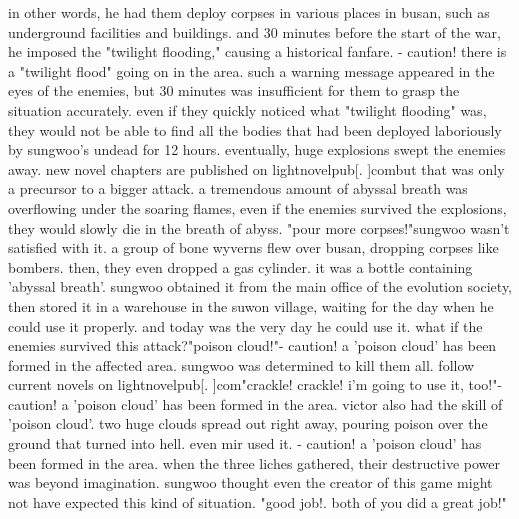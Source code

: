  in other words, he had them deploy corpses in various places in busan, such as underground facilities and buildings.
and 30 minutes before the start of the war, he imposed the "twilight flooding," causing a historical fanfare.
- caution! there is a "twilight flood" going on in the area.
such a warning message appeared in the eyes of the enemies, but 30 minutes was insufficient for them to grasp the situation accurately.
 even if they quickly noticed what "twilight flooding" was, they would not be able to find all the bodies that had been deployed laboriously by sungwoo's undead for 12 hours.
eventually, huge explosions swept the enemies away.
new novel chapters are published on lightnovelpub[.
]combut that was only a precursor to a bigger attack.
 a tremendous amount of abyssal breath was overflowing under the soaring flames, even if the enemies survived the explosions, they would slowly die in the breath of abyss.
"pour more corpses!"sungwoo wasn't satisfied with it.
 a group of bone wyverns flew over busan, dropping corpses like bombers.
then, they even dropped a gas cylinder.
 it was a bottle containing 'abyssal breath'.
 sungwoo obtained it from the main office of the evolution society, then stored it in a warehouse in the suwon village, waiting for the day when he could use it properly.
 and today was the very day he could use it.
 what if the enemies survived this attack?"poison cloud!"- caution! a 'poison cloud' has been formed in the affected area.
sungwoo was determined to kill them all.
follow current novels on lightnovelpub[.
]com"crackle! crackle! i'm going to use it, too!"- caution! a 'poison cloud' has been formed in the area.
victor also had the skill of 'poison cloud'.
 two huge clouds spread out right away, pouring poison over the ground that turned into hell.
even mir used it.
 - caution! a 'poison cloud' has been formed in the area.
when the three liches gathered, their destructive power was beyond imagination.
 sungwoo thought even the creator of this game might not have expected this kind of situation.
"good job!.
 both of you did a great job!"

